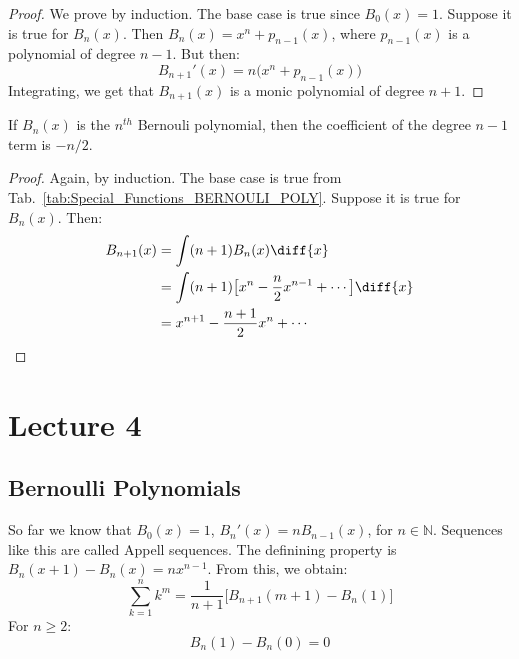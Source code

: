             \begin{proof}
                We prove by induction. The base case is true since
                $B_{0}(x)=1$. Suppose it is true for $B_{n}(x)$.
                Then $B_{n}(x)=x^{n}+p_{n-1}(x)$, where
                $p_{n-1}(x)$ is a polynomial of degree $n-1$.
                But then:
                \begin{equation}
                    B_{n+1}'(x)=n\big(x^{n}+p_{n-1}(x)\big)
                \end{equation}
                Integrating, we get that $B_{n+1}(x)$ is a monic
                polynomial of degree $n+1$.
            \end{proof}
            \begin{theorem}
                If $B_{n}(x)$ is the $n^{th}$ Bernouli polynomial,
                then the coefficient of the degree $n-1$ term is
                $-n/2$.
            \end{theorem}
            \begin{proof}
                Again, by induction. The base case is true from
                Tab.~\ref{tab:Special_Functions_BERNOULI_POLY}.
                Suppose it is true for $B_{n}(x)$. Then:
                \begin{align*}
                    B_{n+1}(x)&=
                    \int(n+1)B_{n}(x)\diff{x}\\
                    &=\int(n+1)
                    \big[x^{n}-\frac{n}{2}x^{n-1}+\cdots\big]
                    \diff{x}\\
                    &=x^{n+1}-\frac{n+1}{2}x^{n}+\cdots
                \end{align*}
            \end{proof}
    \section{Lecture 4}
        \subsection{Bernoulli Polynomials}
            So far we know that $B_{0}(x)=1$, 
            $B_{n}'(x)=nB_{n-1}(x)$, for $n\in\mathbb{N}$.
            Sequences like this are called Appell sequences.
            The definining property is
            $B_{n}(x+1)-B_{n}(x)=nx^{n-1}$. From this, we obtain:
            \begin{equation}
                \sum_{k=1}^{n}k^{m}=
                \frac{1}{n+1}\Big[B_{n+1}(m+1)-B_{n}(1)\Big]
            \end{equation}
            For $n\geq{2}$:
            \begin{equation}
                B_{n}(1)-B_{n}(0)=0
            \end{equation}
